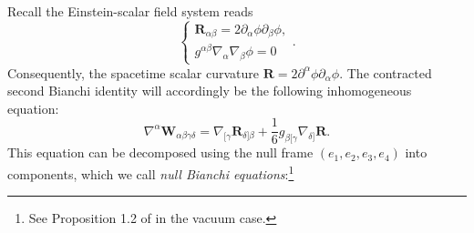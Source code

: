 \documentclass[11pt,reqno]{amsart}
\theoremstyle{definition}
\numberwithin{equation}{section}
\begin{document}
Recall the Einstein-scalar field system reads
\begin{equation*}
\begin{cases}\mathbf{R}_{\alpha\beta}=2\partial_{\alpha}\phi\partial_{\beta}\phi,\\
g^{\alpha\beta}\nabla_\alpha\nabla_\beta\phi=0\end{cases}.
\end{equation*}
Consequently, the spacetime scalar curvature $\mathbf{R}=2\partial^{\alpha}\phi\partial_{\alpha}\phi$.
The contracted second Bianchi identity will accordingly be the following inhomogeneous equation:
\begin{equation*}
\nabla^{\alpha}\mathbf{W}_{\alpha\beta\gamma\delta}=\nabla_{[\gamma}\mathbf{R}_{\delta]\beta}+\frac{1}{6}g_{\beta[\gamma}\nabla_{\delta]}\mathbf{R}.
\end{equation*}
This equation can be decomposed using the null frame $(e_1,e_2,e_3,e_4)$ into components, which we call \textit{null Bianchi equations}:\footnote{See Proposition 1.2 of \cite{Chr} in the vacuum case.}
\end{document}
